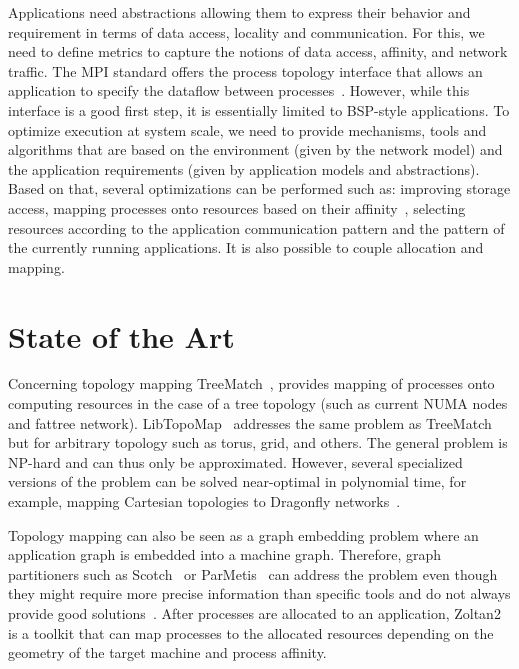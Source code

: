Applications need abstractions allowing them to express their behavior
and requirement in terms of data access, locality and communication.
For this, we need to define metrics to capture the notions of data
access, affinity, and network traffic. The MPI standard offers the
process topology interface that allows an application to specify the
dataflow between processes~\cite{hoefler-mpi-2.2-scal-topo}. However,
while this interface is a good first step, it is essentially limited to
BSP-style applications.
%
To optimize execution at system scale, we need to provide mechanisms,
tools and algorithms that are based on the environment (given by the
network model) and the application requirements (given by application
models and abstractions). Based on that, several optimizations can be
performed such as: improving storage access, mapping processes onto
resources based on their
affinity~\cite{hjm14,DBLP:conf/ics/HoeflerS11,Navauxandal2009},
selecting resources according to the application communication pattern
and the pattern of the currently running applications. It is also
possible to couple allocation and mapping.


\section{State of the Art}
Concerning topology mapping TreeMatch~\cite{jmt14b}, provides mapping of
processes onto computing resources in the case of a tree topology (such
as current NUMA nodes and fattree network).
LibTopoMap~\cite{DBLP:conf/ics/HoeflerS11} addresses the same problem as
TreeMatch but for arbitrary topology such as torus, grid, and others.
The general problem is NP-hard and can thus only be approximated.
However, several specialized versions of the problem can be solved
near-optimal in polynomial time, for example, mapping Cartesian
topologies to Dragonfly networks~\cite{prisacari-dragonfly-mapping}.

Topology mapping can also be seen as a graph embedding problem where an
application graph is embedded into a machine graph.  Therefore, graph
partitioners such as Scotch~\cite{scotch-man} or
ParMetis~\cite{karypis2003parmetis} can address the problem even though
they might require more precise information than specific tools and do
not always provide good solutions~\cite{jmt14b}.  After processes are
allocated to an application, Zoltan2~\cite{zoltan2,drl+14} is a toolkit
that can map processes to the allocated resources depending on the
geometry of the target machine and process affinity.


